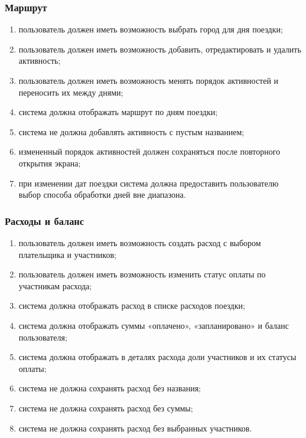 \documentclass[12pt,a4paper]{article}
\begin{document}
\subsubsection{Маршрут}
\begin{enumerate}
  \item пользователь должен иметь возможность выбрать город для дня поездки;
  \item пользователь должен иметь возможность добавить, отредактировать и удалить активность;
  \item пользователь должен иметь возможность менять порядок активностей и переносить их между днями;
  \item система должна отображать маршрут по дням поездки;
  \item система не должна добавлять активность с пустым названием;
  \item измененный порядок активностей должен сохраняться после повторного открытия экрана;
  \item при изменении дат поездки система должна предоставить пользователю выбор способа обработки дней вне диапазона.
\end{enumerate}

\subsubsection{Расходы и баланс}
\begin{enumerate}
  \item пользователь должен иметь возможность создать расход с выбором плательщика и участников;
  \item пользователь должен иметь возможность изменить статус оплаты по участникам расхода;
  \item система должна отображать расход в списке расходов поездки;
  \item система должна отображать суммы «оплачено», «запланировано» и баланс пользователя;
  \item система должна отображать в деталях расхода доли участников и их статусы оплаты;
  \item система не должна сохранять расход без названия;
  \item система не должна сохранять расход без суммы;
  \item система не должна сохранять расход без выбранных участников.
\end{enumerate}
\end{document}
